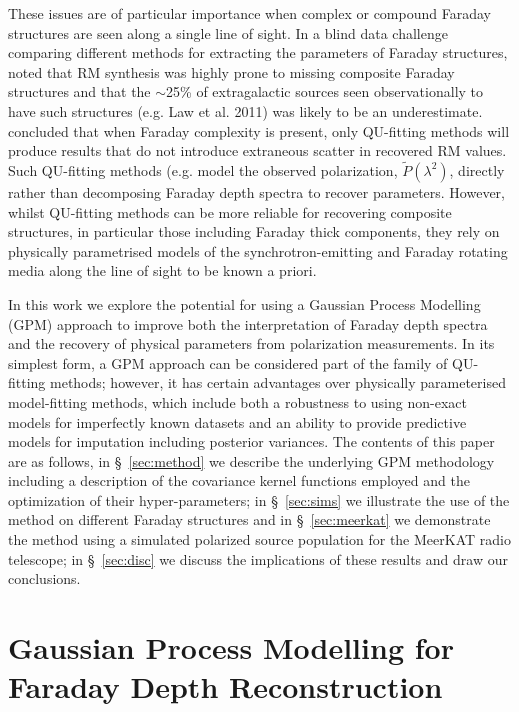 \documentclass[fleqn,usenatbib]{mnras}
\begin{document}
These issues are of particular importance when complex or compound Faraday structures are seen along a single line of sight. In a blind data challenge comparing different methods for extracting the parameters of Faraday structures, \cite{Sun_2015} noted that RM synthesis was highly prone to missing composite Faraday structures and that the $\sim$25\% of extragalactic sources seen observationally to have such structures (e.g. Law et al. 2011) was likely to be an underestimate. \cite{Sun_2015} concluded that when Faraday complexity is present, only QU-fitting methods will produce results that do not introduce extraneous scatter in recovered RM values. Such QU-fitting methods (e.g. \cite{Farnsworth_2011, 10.1111/j.1365-2966.2012.20554.x, 2014ApJ...792...51I} model the observed polarization, $\tilde{P}(\lambda^2)$, directly rather than decomposing Faraday depth spectra to recover parameters. However, whilst QU-fitting methods can be more reliable for recovering composite structures, in particular those including Faraday thick components, they rely on physically parametrised models of the synchrotron-emitting and Faraday rotating media along the line of sight to be known a priori. 

In this work we explore the potential for using a Gaussian Process Modelling (GPM) approach to improve both the interpretation of Faraday depth spectra and the recovery of physical parameters from polarization measurements. In its simplest form, a GPM approach can be considered part of the family of QU-fitting methods; however, it has certain advantages over physically parameterised model-fitting methods, which include both a robustness to using non-exact models for imperfectly known datasets and an ability to provide predictive models for imputation including posterior variances.  The contents of this paper are as follows, in \S~\ref{sec:method} we describe the underlying GPM methodology including a description of the covariance kernel functions employed and the optimization of their hyper-parameters; in \S~\ref{sec:sims} we illustrate the use of the method on different Faraday structures and in \S~\ref{sec:meerkat} we demonstrate the method using a simulated polarized source population for the MeerKAT radio telescope; in \S~\ref{sec:disc} we discuss the implications of these results and draw our conclusions.

\section{Gaussian Process Modelling for Faraday Depth Reconstruction}
\label{sec:astrogpm}
\end{document}
